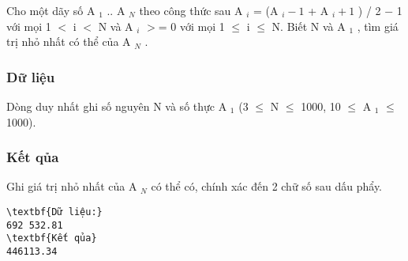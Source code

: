 



   Cho một dãy số A   $_    1   $   .. A   $_    N   $   theo công thức sau A   $_    i   $   = (A   $_    i−1   $   + A   $_    i+1   $   ) / 2 − 1 với mọi 1 $<$ i $<$ N và A   $_    i   $   $>$= 0 với mọi 1  $\le$  i  $\le$  N. Biết N và A   $_    1   $   , tìm giá trị nhỏ nhất có thể của A   $_    N   $   .  

\subsubsection{   Dữ liệu  }

   Dòng duy nhất ghi số nguyên N và số thực A   $_    1   $   (3  $\le$  N  $\le$  1000, 10  $\le$  A   $_    1   $    $\le$  1000).  

\subsubsection{   Kết qủa  }

   Ghi giá trị nhỏ nhất của A   $_    N   $   có thể có, chính xác đến 2 chữ số sau dấu phẩy.  
\begin{verbatim}
\textbf{Dữ liệu:} 
692 532.81
\textbf{Kết qủa} 
446113.34 
\end{verbatim}
